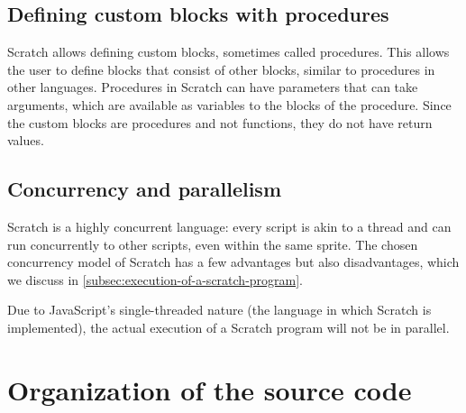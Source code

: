 \documentclass[../main]{subfiles}
\begin{document}
\subsection{Defining custom blocks with procedures}\label{subsec:defining-custom-blocks-with-procedures}

Scratch allows defining custom blocks, sometimes called procedures.
This allows the user to define blocks that consist of other blocks, similar to procedures in other languages.
Procedures in Scratch can have parameters that can take arguments, which are available as variables to the blocks of the procedure.
Since the custom blocks are procedures and not functions, they do not have return values.

\subsection{Concurrency and parallelism}\label{subsec:parallelism}

Scratch is a highly concurrent language: every script is akin to a thread and can run concurrently to other scripts, even within the same sprite.
The chosen concurrency model of Scratch has a few advantages but also disadvantages, which we discuss in \cref{subsec:execution-of-a-scratch-program}.

Due to JavaScript's single-threaded nature (the language in which Scratch is implemented), the actual execution of a Scratch program will not be in parallel.

\section{Organization of the source code}\label{sec:scratch-internal}
\end{document}
